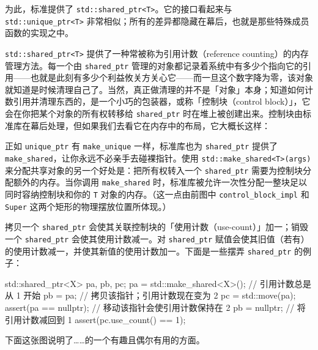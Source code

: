 为此，标准提供了 \texttt{std::\allowbreak{}shared\_\allowbreak{}ptr<\allowbreak{}T>\allowbreak{}}。它的接口看起来与 \texttt{std::\allowbreak{}unique\_\allowbreak{}ptr<\allowbreak{}T>\allowbreak{}} 非常相似；所有的差异都隐藏在幕后，也就是那些特殊成员函数的实现之中。

\texttt{std::\allowbreak{}shared\_\allowbreak{}ptr<\allowbreak{}T>\allowbreak{}} 提供了一种常被称为引用计数（reference counting）的内存管理方法。每一个由 \texttt{shared\_\allowbreak{}ptr} 管理的对象都记录着系统中有多少个指向它的引用——也就是此刻有多少个利益攸关方关心它——而一旦这个数字降为零，该对象就知道是时候清理自己了。当然，真正做清理的并不是「对象」本身；知道如何计数引用并清理东西的，是一个小巧的包装器，或称「控制块（control block）」，它会在你把某个对象的所有权转移给 \texttt{shared\_\allowbreak{}ptr} 时在堆上被创建出来。控制块由标准库在幕后处理，但如果我们去看它在内存中的布局，它大概长这样：


正如 \texttt{unique\_\allowbreak{}ptr} 有 \texttt{make\_\allowbreak{}unique} 一样，标准库也为 \texttt{shared\_\allowbreak{}ptr} 提供了 \texttt{make\_\allowbreak{}shared}，让你永远不必亲手去碰裸指针。使用 \texttt{std::\allowbreak{}make\_\allowbreak{}shared<\allowbreak{}T>\allowbreak{}(\allowbreak{}args)\allowbreak{}} 来分配共享对象的另一个好处是：把所有权转入一个 \texttt{shared\_\allowbreak{}ptr} 需要为控制块分配额外的内存。当你调用 \texttt{make\_\allowbreak{}shared} 时，标准库被允许一次性分配一整块足以同时容纳控制块和你的 \texttt{T} 对象的内存。（这一点由前图中 \texttt{control\_\allowbreak{}block\_\allowbreak{}impl} 和 \texttt{Super} 这两个矩形的物理摆放位置所体现。）

拷贝一个 \texttt{shared\_\allowbreak{}ptr} 会使其关联控制块的「使用计数（use-count）」加一；销毁一个 \texttt{shared\_\allowbreak{}ptr} 会使其使用计数减一。对 \texttt{shared\_\allowbreak{}ptr} 赋值会使其旧值（若有）的使用计数减一，并使其新值的使用计数加一。下面是一些摆弄 \texttt{shared\_\allowbreak{}ptr} 的例子：

\begin{codebox}[cpp]
    std::shared_ptr<X> pa, pb, pc;
    pa = std::make_shared<X>();
    // 引用计数总是从 1 开始
    pb = pa;
    // 拷贝该指针；引用计数现在变为 2
    pc = std::move(pa);
    assert(pa == nullptr);
    // 移动该指针会使引用计数保持在 2
    pb = nullptr;
    // 将引用计数减回到 1
    assert(pc.use_count() == 1);
\end{codebox}

下面这张图说明了……的一个有趣且偶尔有用的方面。

